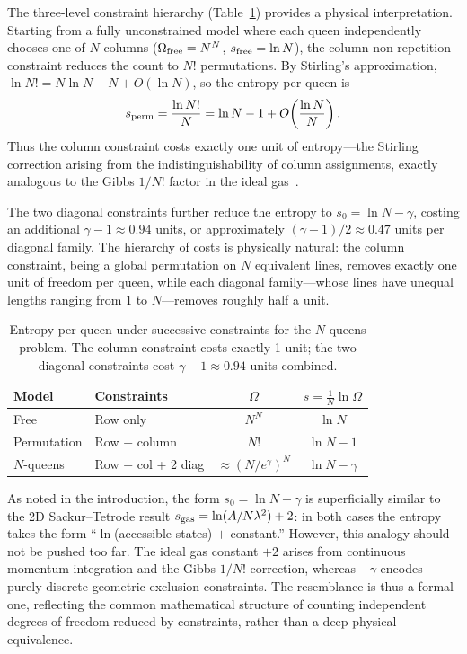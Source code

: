 \documentclass[aps, pre, reprint, amsmath, amssymb, superscriptaddress, floatfix]{revtex4-2}
\begin{document}
The three-level constraint hierarchy (Table~\ref{tab:entropy_levels})
provides a physical interpretation.  Starting from a fully
unconstrained model where each queen independently chooses one of $N$
columns ($\Omega_{\rm free} = N^N$, $s_{\rm free} = \ln N$), the
column non-repetition constraint reduces the count to $N!$
permutations.  By Stirling's approximation,
$\ln N! = N\ln N - N + O(\ln N)$, so the entropy per queen is
\begin{equation}
  s_{\rm perm} = \frac{\ln N!}{N}
  = \ln N - 1 + O\!\left(\frac{\ln N}{N}\right).
  \label{eq:s_perm}
\end{equation}
Thus the column constraint costs exactly one unit of entropy---the
Stirling correction arising from the indistinguishability of column
assignments, exactly analogous to the Gibbs $1/N!$ factor in the ideal
gas~\cite{Reif1965}.

The two diagonal constraints further reduce the entropy to
$s_0 = \ln N - \gamma$, costing an additional $\gamma - 1 \approx
0.94$ units, or approximately $(\gamma - 1)/2 \approx 0.47$ units
per diagonal family.  The hierarchy of costs is physically natural:
the column constraint, being a global permutation on $N$ equivalent
lines, removes exactly one unit of freedom per queen, while each
diagonal family---whose lines have unequal lengths ranging from $1$
to $N$---removes roughly half a unit.

\begin{table}[b]
  \caption{Entropy per queen under successive constraints for the
  $N$-queens problem.  The column constraint costs exactly 1 unit;
  the two diagonal constraints cost $\gamma - 1 \approx 0.94$ units
  combined.}
  \label{tab:entropy_levels}
  \begin{ruledtabular}
  \begin{tabular}{llcc}
    Model & Constraints & $\Omega$ & $s = \frac{1}{N}\ln\Omega$ \\
    \hline
    Free & Row only & $N^N$ & $\ln N$ \\
    Permutation & Row + column & $N!$ & $\ln N - 1$ \\
    $N$-queens & Row + col + 2 diag & $\approx (N/e^\gamma)^N$
      & $\ln N - \gamma$ \\
  \end{tabular}
  \end{ruledtabular}
\end{table}

As noted in the introduction, the form $s_0 = \ln N - \gamma$ is
superficially similar to the 2D Sackur--Tetrode result
$s_{\rm gas} = \ln(A/N\lambda^2) + 2$: in both cases the entropy
takes the form ``$\ln$(accessible states) $+$ constant.''
However, this analogy should not be pushed too far.  The ideal gas
constant $+2$ arises from continuous momentum integration and the
Gibbs $1/N!$ correction, whereas $-\gamma$ encodes purely discrete
geometric exclusion constraints.  The resemblance is thus a formal
one, reflecting the common mathematical structure of counting
independent degrees of freedom reduced by constraints, rather than a
deep physical equivalence.
\end{document}
